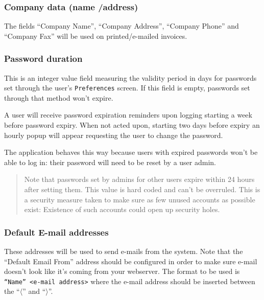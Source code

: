 \subsubsection{Company data (name /address)}
\label{subsubsec-company-config-defaults-name-address}

The fields ``Company Name'', ``Company Address'',
``Company Phone'' and ``Company Fax'' will be used on printed/e-mailed invoices.

\subsubsection{Password duration}
\label{subsubsec-company-config-defaults-password-duration}

This is an integer value field measuring the validity period in days for passwords set through
the user's \texttt{Preferences} screen. If this field is empty, passwords set through that method
won't expire.

A user will receive password expiration reminders upon logging starting a week before password
expiry. When not acted upon, starting two days before expiry an hourly popup will appear
requesting the user to change the password.

The application behaves this way because users with expired passwords won't be able to log in:
their password will need to be reset by a user admin.

\begin{quotation}
Note that passwords set by admins for other users expire within 24 hours after setting them.
This value is hard coded and can't be overruled. This is a security measure taken to make
sure as few unused accounts as possible exist: Existence of such accounts could open up security
holes.
\end{quotation}


\subsubsection{Default E-mail addresses}
\label{subsubsec-company-config-defaults-email}

These addresses will be used to send e-mails from the system.
Note that the ``Default Email From'' address should be configured in order to make sure
e-mail doesn't look like it's coming from your webserver. The format to be used is \texttt{``Name'' <e-mail address>} where the e-mail address should be inserted between the
``$\langle$'' and ``$\rangle$''.

